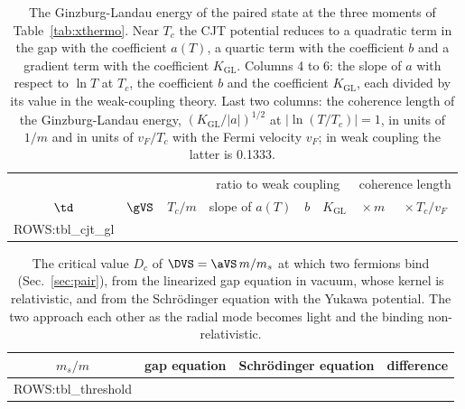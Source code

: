 \begin{table}
\caption{\label{tab:xgl}The Ginzburg-Landau energy of the paired state at the three moments of
Table~\ref{tab:xthermo}. Near $T_c$ the CJT potential reduces to a quadratic term in the gap with the
coefficient $a(T)$, a quartic term with the coefficient $b$ and a gradient term with the coefficient
$K_{\mathrm{GL}}$. Columns 4 to 6: the slope of $a$ with respect to $\ln T$ at $T_c$, the coefficient
$b$ and the coefficient $K_{\mathrm{GL}}$, each divided by its value in the weak-coupling theory.
Last two columns: the coherence length of the Ginzburg-Landau energy, $(K_{\mathrm{GL}}/|a|)^{1/2}$ at
$|\ln(T/T_c)|=1$, in units of $1/m$ and in units of $v_F/T_c$ with the Fermi velocity $v_F$; in weak
coupling the latter is 0.1333.}
\begin{ruledtabular}
\begin{tabular}{cccccccc}
 & & & \multicolumn{3}{c}{ratio to weak coupling} & \multicolumn{2}{c}{coherence length} \\
$\td$ & $\gVS$ & $T_c/m$ & slope of $a(T)$ & $b$ & $K_{\mathrm{GL}}$ & $\times\,m$ & $\times\,T_c/v_F$ \\
\hline
{{ROWS:tbl_cjt_gl}}
\end{tabular}
\end{ruledtabular}
\end{table}

\begin{table}
\caption{\label{tab:xthreshold}The critical value $D_c$ of $\DVS=\aVS\,m/m_s$ at which two fermions
bind (Sec.~\ref{sec:pair}), from the linearized gap equation in vacuum, whose kernel is relativistic,
and from the Schr\"odinger equation with the Yukawa potential. The two approach each other as the
radial mode becomes light and the binding non-relativistic.}
\begin{ruledtabular}
\begin{tabular}{cccc}
$m_s/m$ & gap equation & Schr\"odinger equation & difference \\
\hline
{{ROWS:tbl_threshold}}
\end{tabular}
\end{ruledtabular}
\end{table}

